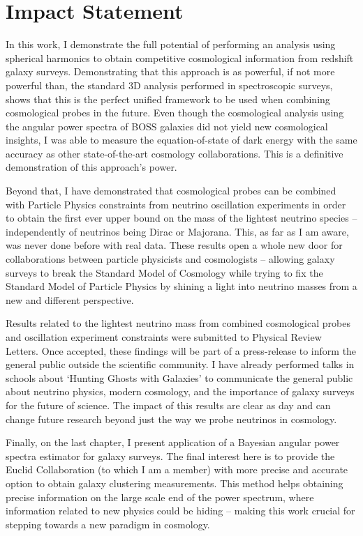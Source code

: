 \chapter*{Impact Statement}
\label{sec:impact}
\vspace*{-10mm}

In this work, I demonstrate the full potential of performing an analysis using spherical harmonics to obtain competitive cosmological information from redshift galaxy surveys. Demonstrating that this approach is as powerful, if not more powerful than, the standard 3D analysis performed in spectroscopic surveys, shows that this is the perfect unified framework to be used when combining cosmological probes in the future. Even though the cosmological analysis using the angular power spectra of BOSS galaxies did not yield new cosmological insights, I was able to measure the equation-of-state of dark energy with the same accuracy as other state-of-the-art cosmology collaborations. This is a definitive demonstration of this approach's power.

\qquad Beyond that, I have demonstrated that cosmological probes can be combined with Particle Physics constraints from neutrino oscillation experiments in order to obtain the first ever upper bound on the mass of the lightest neutrino species -- independently of neutrinos being Dirac or Majorana. This, as far as I am aware, was never done before with real data. These results open a whole new door for collaborations between particle physicists and cosmologists -- allowing galaxy surveys to break the Standard Model of Cosmology while trying to fix the Standard Model of Particle Physics by shining a light into neutrino masses from a new and different perspective.

\qquad Results related to the lightest neutrino mass from combined cosmological probes and oscillation experiment constraints were submitted to Physical Review Letters. Once accepted, these findings will be part of a press-release to inform the general public outside the scientific community. I have already performed talks in schools about `Hunting Ghosts with Galaxies' to communicate the general public about neutrino physics, modern cosmology, and the importance of galaxy surveys for the future of science. The impact of this results are clear as day and can change future research beyond just the way we probe neutrinos in cosmology.

\qquad Finally, on the last chapter, I present application of a Bayesian angular power spectra estimator for galaxy surveys. The final interest here is to provide the Euclid Collaboration (to which I am a member) with more precise and accurate option to obtain galaxy clustering measurements. This method helps obtaining precise information on the large scale end of the power spectrum, where information related to new physics could be hiding -- making this work crucial for stepping towards a new paradigm in cosmology.